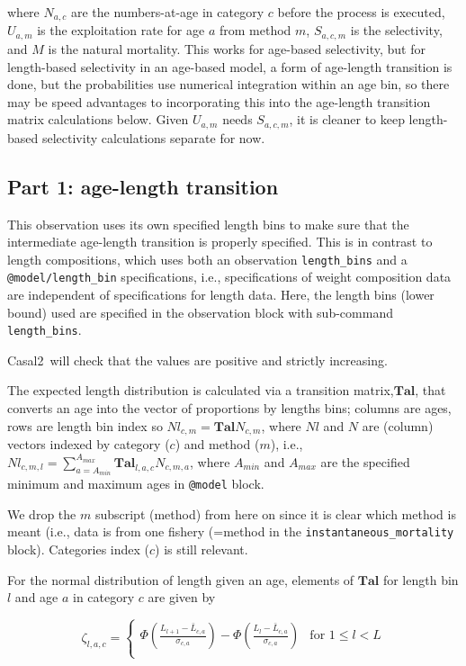 \documentclass[a4paper,11pt,twoside,pdftex,draft]{article}
\newcommand{\CNAME}{Casal2}
\begin{document}
where $N_{a,c}$ are the numbers-at-age in category $c$ before the process is executed, $U_{a,m}$ is the exploitation rate for age $a$ from method $m$, $S_{a,c,m}$ is the selectivity, and $M$ is the natural mortality. This works for age-based selectivity, but for length-based selectivity in an age-based model, a form of age-length transition is done, but the probabilities use numerical integration within an age bin, so there may be speed advantages to incorporating this into the age-length transition matrix calculations below. Given $U_{a,m}$ needs $S_{a,c,m} $, it is cleaner to keep length-based selectivity calculations separate for now.




\subsection{Part 1: age-length transition}
This observation uses its own specified length bins to make sure that the intermediate age-length transition is properly specified. This is in contrast to length compositions, which uses both an observation \texttt{length\_bins} and a  \texttt{@model/length\_bin}  specifications, i.e., specifications of weight composition data are independent of specifications for length data. Here, the length bins (lower bound) used are specified in the observation block with sub-command \texttt{length\_bins}.

\CNAME~will check that the values are positive and strictly increasing. 

The expected length distribution is calculated via 
a transition matrix,$\mathbf{Tal}$, that converts an age into the vector of proportions by lengths bins; columns are ages, rows are length bin index so $Nl_{c,m} = \mathbf{Tal} N_{c,m}$, where $Nl$ and $N$ are (column) vectors indexed by category ($c$) and method ($m$), i.e.,
$Nl_{c,m,l} = \sum_{a=A_{min}}^{A_{max}}  \mathbf{Tal}_{l,a,c} N_{c,m,a}$, where $A_{min}$ and $A_{max}$ are the specified minimum and maximum ages in \texttt{@model} block.

We drop the $m$ subscript (method) from here on since it is clear which method is meant (i.e., data is from one fishery (=method in the \texttt{instantaneous\_mortality} block). Categories index ($c$) is still relevant.

For the normal distribution of length given an age, 
elements of $\mathbf{Tal}$ for length bin $l$ and age $a$ in category $c$ are given by

\begin{equation}
\zeta_{l,a,c} =
\begin{cases}

\Phi\left( \frac{L_{l+1} - \bar L_{c,a}   }{\sigma_{c,a}} \right) - \Phi\left( \frac{L_{l} - \bar L_{c,a}   }{\sigma_{c,a}} \right) & \text{for } 1 \leq l < L \\

\end{cases}
\end{equation}
\end{document}
